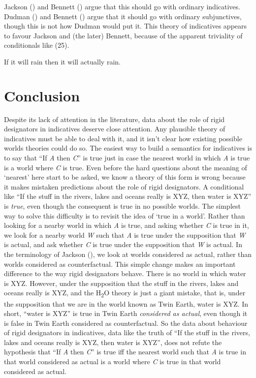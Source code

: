 \documentclass[
  11pt,
  letterpaper,
  DIV=11,
  numbers=noendperiod,
  twoside]{scrartcl}
\providecommand{\tightlist}{%
  \setlength{\itemsep}{0pt}\setlength{\parskip}{0pt}}
\begin{document}
Jackson () and Bennett
() argue that this should go with
ordinary indicatives. Dudman () and
Bennett () argue that it should go with
ordinary subjunctives, though this is not how Dudman would put it. This
theory of indicatives appears to favour Jackson and (the later) Bennett,
because of the apparent triviality of conditionals like (25).

\begin{description}
\tightlist
\item[(25)]
If it will rain then it will actually rain.
\end{description}

\section{Conclusion}\label{conclusion}

Despite its lack of attention in the literature, data about the role of
rigid designators in indicatives deserve close attention. Any plausible
theory of indicatives must be able to deal with it, and it isn't clear
how existing possible worlds theories could do so. The easiest way to
build a semantics for indicatives is to say that ``If \emph{A} then
\emph{C}'' is true just in case the nearest world in which \emph{A} is
true is a world where \emph{C} is true. Even before the hard questions
about the meaning of `nearest' here start to be asked, we know a theory
of this form is wrong because it makes mistaken predictions about the
role of rigid designators. A conditional like ``If the stuff in the
rivers, lakes and oceans really is XYZ, then water is XYZ'' is
\emph{true}, even though the consequent is true in no possible worlds.
The simplest way to solve this difficulty is to revisit the idea of
`true in a world'. Rather than looking for a nearby world in which
\emph{A} is true, and asking whether \emph{C} is true in it, we look for
a nearby world \emph{W} such that \emph{A} is true under the supposition
that \emph{W} is actual, and ask whether \emph{C} is true under the
supposition that \emph{W} is actual. In the terminology of Jackson
(), we look at worlds considered as
actual, rather than worlds considered as counterfactual. This simple
change makes an important difference to the way rigid designators
behave. There is no world in which water is XYZ. However, under the
supposition that the stuff in the rivers, lakes and oceans really is
XYZ, and the H\textsubscript{2}O theory is just a giant mistake, that
is, under the supposition that we are in the world known as Twin Earth,
water is XYZ. In short, ``water is XYZ'' is true in Twin Earth
\emph{considered as actual}, even though it is false in Twin Earth
considered as counterfactual. So the data about behaviour of rigid
designators in indicatives, data like the truth of ``If the stuff in the
rivers, lakes and oceans really is XYZ, then water is XYZ'', does not
refute the hypothesis that ``If \emph{A} then \emph{C}'' is true iff the
nearest world such that \emph{A} is true in that world considered as
actual is a world where \emph{C} is true in that world considered as
actual.
\end{document}
